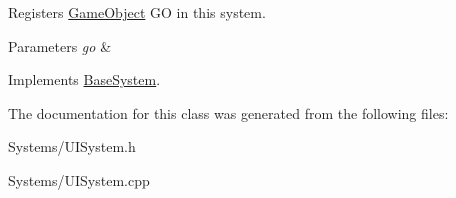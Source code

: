 Registers \hyperlink{classGameObject}{Game\+Object} GO in this system. 


\begin{DoxyParams}{Parameters}
{\em go} & \\
\hline
\end{DoxyParams}


Implements \hyperlink{classBaseSystem}{Base\+System}.



The documentation for this class was generated from the following files\+:\begin{DoxyCompactItemize}
\item 
Systems/U\+I\+System.\+h\item 
Systems/U\+I\+System.\+cpp\end{DoxyCompactItemize}
